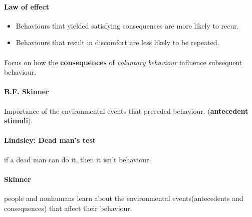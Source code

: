 \documentclass{article}
\begin{document}
	\paragraph{Law of effect}
	\begin{itemize}
		\item Behaviours that yielded satisfying consequences are more likely to recur.
		\item Behaviours that result in discomfort are less likely to be repeated.
	\end{itemize}
	\paragraph{} Focus on how the \textbf{consequences} of \emph{voluntary behaviour} influence subsequent behaviour.
	\paragraph{B.F. Skinner} Importance of the environmental events that preceded behaviour. (\textbf{antecedent stimuli}).
	\paragraph{Lindsley: Dead man's test} if a dead man can do it, then it isn't behaviour.
	\paragraph{Skinner} people and nonhumans learn about the environmental events(antecedents and consequences) that affect their behaviour.
\end{document}

